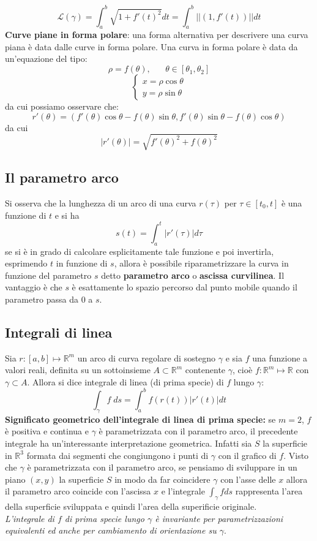 \documentclass[a4paper]{article}
\numberwithin{equation}{subsection}
\begin{document}
\[\mathcal{L}(\gamma) = \int_{a}^{b} \sqrt{1 + f'(t)^2}dt = \int_{a}^{b} ||(1, f'(t))||dt\]
\textbf{Curve piane in forma polare}: una forma alternativa per descrivere una curva piana è data dalle curve in forma polare.
Una curva in forma polare è data da un'equazione del tipo:
\[\rho = f(\theta),\; \; \; \; \; \; \theta \in [\theta_1, \theta_2]\]
\[\begin{cases}
    x = \rho\cos{\theta}\\
    y = \rho\sin{\theta}
\end{cases}\]
da cui possiamo osservare che:
\[r'(\theta) = (f'(\theta)\cos{\theta} - f(\theta)\sin{\theta}, f'(\theta)\sin{\theta} - f(\theta)\cos{\theta})\]
da cui 
\[|r'(\theta)| = \sqrt{f'(\theta)^2 + f(\theta)^2}\]


\subsection{Il parametro arco}

 Si osserva che la lunghezza di un arco di una curva $r(\tau)$ per $\tau \in [t_0, t]$ è una funzione di $t$ e si ha 
\[s(t) = \int_{a}^{t} |r'(\tau)|d\tau\]
se si è in grado di calcolare esplicitamente tale funzione e poi invertirla, esprimendo $t$ in funzione di $s$, allora è possibile riparametrizzare la curva in funzione del parametro $s$ detto
\textbf{parametro arco} o \textbf{ascissa curvilinea}. Il vantaggio è che $s$ è esattamente lo spazio percorso dal punto mobile quando il parametro passa da 0 a $s$. 

\subsection{Integrali di linea}

{
    Sia $r : [a,b] \mapsto \mathbb{R}^m$ un arco di curva regolare di sostegno $\gamma$ e sia $f$ una funzione a valori reali, definita su un sottoinsieme $A \subset \mathbb{R}^m$ contenente
    $\gamma$, cioè $f: \mathbb{R}^m \mapsto \mathbb{R}$ con $\gamma \subset A$. Allora si dice integrale di linea (di prima specie) di $f$ lungo $\gamma$:
    \[\int_{\gamma} f \; ds = \int_{a}^{b} f(r(t))|r'(t)|dt\]
}
\noindent
\textbf{Significato geometrico dell'integrale di linea di prima specie: } se $m = 2$, $f$ è positiva e continua e $\gamma$ è parametrizzata con il parametro arco, il precedente integrale ha un'interessante interpretazione geometrica. 
Infatti sia $S$ la superficie in $\mathbb{R}^3$ formata dai segmenti che congiungono i punti di $\gamma$ con il grafico di $f$.
Visto che $\gamma$ è parametrizzata con il parametro arco, se pensiamo di sviluppare in un piano $(x,y)$ la superficie $S$ in modo da far coincidere
$\gamma$ con l'asse delle $x$ allora il parametro arco coincide con l'ascissa $x$ e l'integrale $\int_{\gamma} f ds$ rappresenta l'area della superficie sviluppata e quindi l'area della superificie originale.
\\
\textit{L'integrale di $f$ di prima specie lungo $\gamma$ è invariante per parametrizzazioni equivalenti ed anche per cambiamento di orientazione su $\gamma$}.
\end{document}
